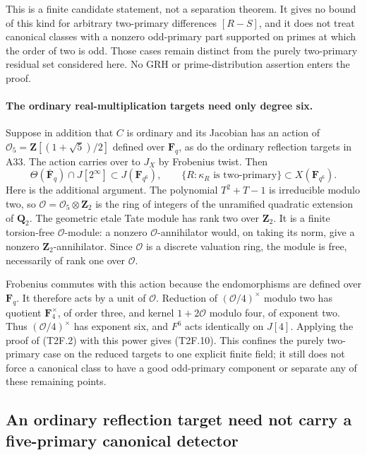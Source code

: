 \documentclass[11pt,a4paper]{article}
\begin{document}
This is a finite candidate statement, not a separation theorem.
It gives no bound of this kind for arbitrary two-primary
differences $[R-S]$, and it does not treat canonical classes
with a nonzero odd-primary part supported on primes at which
the order of two is odd. Those cases remain distinct from the
purely two-primary residual set considered here. No GRH or
prime-distribution assertion enters the proof.

\paragraph{The ordinary real-multiplication targets need only degree six.}
Suppose in addition that $C$ is ordinary and its Jacobian has an
action of $\mathcal O_5=\mathbf Z[(1+\sqrt5)/2]$ defined over
$\mathbf F_q$, as do the ordinary reflection targets in A33.
The action carries over to $J_X$ by Frobenius twist. Then
\[
 \Theta(\overline{\mathbf F}_q)\cap J[2^\infty]
                     \subset J(\mathbf F_{q^6}),
 \qquad
 \{R:\kappa_R\text{ is two-primary}\}
                     \subset X(\mathbf F_{q^6}).
 \tag{T2F.10}
\]
Here is the additional argument. The polynomial $T^2+T-1$ is
irreducible modulo two, so
$\mathcal O=\mathcal O_5\otimes\mathbf Z_2$ is the ring of
integers of the unramified quadratic extension of $\mathbf Q_2$.
The geometric etale Tate module has rank two over $\mathbf Z_2$.
It is a finite torsion-free $\mathcal O$-module: a nonzero
$\mathcal O$-annihilator would, on taking its norm, give a
nonzero $\mathbf Z_2$-annihilator. Since $\mathcal O$ is a
discrete valuation ring, the module is free, necessarily of
rank one over $\mathcal O$.

Frobenius commutes with this action because the endomorphisms are
defined over $\mathbf F_q$. It therefore acts by a unit of
$\mathcal O$. Reduction of $(\mathcal O/4)^\times$ modulo two
has quotient $\mathbf F_4^\times$, of order three, and kernel
$1+2\mathcal O$ modulo four, of exponent two. Thus
$(\mathcal O/4)^\times$ has exponent six, and $F^6$ acts
identically on $J[4]$. Applying the proof of (T2F.2) with this
power gives (T2F.10). This confines the purely two-primary case
on the reduced targets to one explicit finite field; it still
does not force a canonical class to have a good odd-primary
component or separate any of these remaining points.


\subsection{An ordinary reflection target need not carry a five-primary canonical detector}
\end{document}
